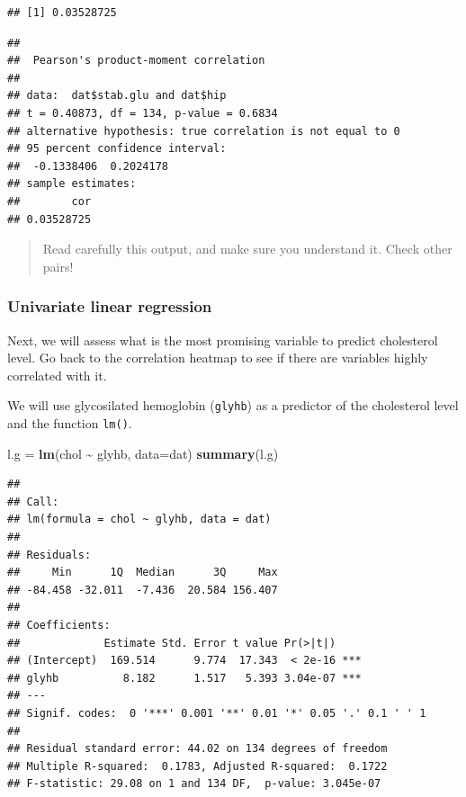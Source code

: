 \documentclass[
]{book}
\newenvironment{Shaded}{\begin{snugshade}}{\end{snugshade}}
\newcommand{\AttributeTok}[1]{\textcolor[rgb]{0.13,0.29,0.53}{#1}}
\newcommand{\DocumentationTok}[1]{\textcolor[rgb]{0.56,0.35,0.01}{\textbf{\textit{#1}}}}
\newcommand{\FunctionTok}[1]{\textcolor[rgb]{0.13,0.29,0.53}{\textbf{#1}}}
\newcommand{\NormalTok}[1]{#1}
\newcommand{\OtherTok}[1]{\textcolor[rgb]{0.56,0.35,0.01}{#1}}
\newcommand{\SpecialCharTok}[1]{\textcolor[rgb]{0.81,0.36,0.00}{\textbf{#1}}}
\begin{document}
\begin{verbatim}
## [1] 0.03528725
\end{verbatim}

\begin{Shaded}
\end{Shaded}

\begin{verbatim}
## 
##  Pearson's product-moment correlation
## 
## data:  dat$stab.glu and dat$hip
## t = 0.40873, df = 134, p-value = 0.6834
## alternative hypothesis: true correlation is not equal to 0
## 95 percent confidence interval:
##  -0.1338406  0.2024178
## sample estimates:
##        cor 
## 0.03528725
\end{verbatim}

\begin{quote}
Read carefully this output, and make sure you understand it. Check other pairs!
\end{quote}

\hypertarget{univariate-linear-regression}{%
\subsubsection{Univariate linear regression}\label{univariate-linear-regression}}

Next, we will assess what is the most promising variable to predict cholesterol level. Go back to the correlation heatmap to see if there are variables highly correlated with it.

We will use glycosilated hemoglobin (\texttt{glyhb}) as a predictor of the cholesterol level and the function \texttt{lm()}.

\begin{Shaded}
\begin{Highlighting}[]
\NormalTok{l.g }\OtherTok{=} \FunctionTok{lm}\NormalTok{(chol }\SpecialCharTok{\textasciitilde{}}\NormalTok{ glyhb, }\AttributeTok{data=}\NormalTok{dat)}
\FunctionTok{summary}\NormalTok{(l.g)}
\end{Highlighting}
\end{Shaded}

\begin{verbatim}
## 
## Call:
## lm(formula = chol ~ glyhb, data = dat)
## 
## Residuals:
##     Min      1Q  Median      3Q     Max 
## -84.458 -32.011  -7.436  20.584 156.407 
## 
## Coefficients:
##             Estimate Std. Error t value Pr(>|t|)    
## (Intercept)  169.514      9.774  17.343  < 2e-16 ***
## glyhb          8.182      1.517   5.393 3.04e-07 ***
## ---
## Signif. codes:  0 '***' 0.001 '**' 0.01 '*' 0.05 '.' 0.1 ' ' 1
## 
## Residual standard error: 44.02 on 134 degrees of freedom
## Multiple R-squared:  0.1783, Adjusted R-squared:  0.1722 
## F-statistic: 29.08 on 1 and 134 DF,  p-value: 3.045e-07
\end{verbatim}
\end{document}
